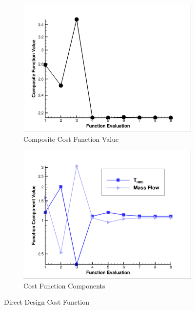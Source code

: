 \begin{figure}[h]
  \centering
	\begin{subfigure}[b]{0.4\textwidth}
    \centering
    \includegraphics[width=\textwidth]{figures/direct_design/cost-func.png}
    \caption{Composite Cost Function Value}
    \label{fig:dd-cost-func-value}
  \end{subfigure}
	\begin{subfigure}[b]{0.4\textwidth}
    \centering
    \includegraphics[width=\textwidth]{figures/direct_design/components.png}
    \caption{Cost Function Components}
    \label{fig:dd-components}
  \end{subfigure}
  \caption{Direct Design Cost Function}
  \label{fig:dd-cost-func}
\end{figure}
